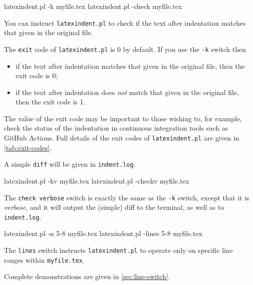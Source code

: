 	\begin{commandshell}
latexindent.pl -k myfile.tex
latexindent.pl -check myfile.tex
\end{commandshell}
	You can%
	 instruct
	\texttt{latexindent.pl} to check if the text after indentation matches that given in the
	original file.

	The \texttt{exit} code
	 of \texttt{latexindent.pl} is 0 by default. If
	you use the \texttt{-k} switch then
	\begin{itemize}
		\item if the text after indentation matches that given in the original file, then the exit code
		      is 0;
		\item if the text after indentation does \emph{not} match that given in the original file, then
		      the exit code is 1.
	\end{itemize}

	The value of the exit code may be important to those wishing to, for example, check the
	status of the indentation in continuous integration tools such as GitHub Actions. Full
	details of the exit codes of \texttt{latexindent.pl} are given in \cref{tab:exit-codes}.

	A simple \texttt{diff} will be given in \texttt{indent.log}.

	\begin{commandshell}
latexindent.pl -kv myfile.tex
latexindent.pl -checkv myfile.tex
\end{commandshell}
	 The \texttt{check verbose}
	switch is exactly the same as the \texttt{-k} switch, except that it is \emph{verbose},
	and it will output the (simple) diff to the terminal, as well as to \texttt{indent.log}.

	\begin{commandshell}
latexindent.pl -n 5-8 myfile.tex
latexindent.pl -lines 5-8 myfile.tex
\end{commandshell}
	 The \texttt{lines} switch instructs
	\texttt{latexindent.pl} to operate only on specific line ranges within
	\texttt{myfile.tex}.

	Complete demonstrations are given in \cref{sec:line-switch}.

